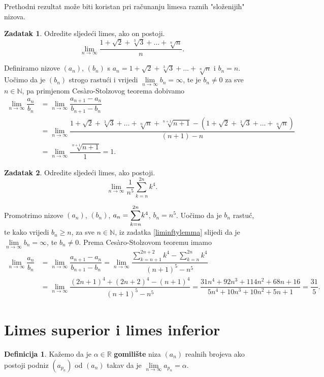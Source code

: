 \documentclass{book}
\renewenvironment{proof}{%
    \vspace{-\parskip}\begin{oldproof}%
    }{%
    \end{oldproof}%
}
\theoremstyle{definition}
\theoremstyle{definition}
\newtheorem{definition}{Definicija}
\newtheorem{exercise}{Zadatak}
\theoremstyle{remark}
\begin{document}
Prethodni rezultat može biti koristan pri računanju limesa raznih "složenijih" nizova.
\begin{exercise}
Odredite sljedeći limes, ako on postoji. 
$$\lim\limits_{n\to \infty}{\dfrac{1+\sqrt{2}+\sqrt[3]{3}+\dots+\sqrt[n]{n}}{n}}.$$
\end{exercise}
\begin{proof}[Rješenje]
Definiramo nizove $(a_n)$, $(b_n)$ s $a_n=1+\sqrt{2}+\sqrt[3]{3}+\dots+\sqrt[n]{n}$ i $b_n=n$. Uočimo da je $(b_n)$ strogo rastući i vrijedi $\lim\limits_{n\to \infty}{b_n}=\infty$, te je $b_n\neq 0$ za sve $n\in \mathbb{N}$, pa primjenom Cesàro-Stolzovog teorema dobivamo
\begin{align*}
\lim\limits_{n\to \infty}{\dfrac{a_n}{b_n}}&=\lim\limits_{n\to \infty}{\dfrac{a_{n+1}-a_n}{b_{n+1}-b_n}}\\
&=\lim\limits_{n\to \infty}{\dfrac{1+\sqrt{2}+\sqrt[3]{3}+\dots+\sqrt[n]{n}+\sqrt[n+1]{n+1}-(1+\sqrt{2}+\sqrt[3]{3}+\dots+\sqrt[n]{n})}{(n+1)-n}}\\
&=\lim\limits_{n\to \infty}{\dfrac{\sqrt[n+1]{n+1}}{1}}=1.
\end{align*}
\end{proof}
\begin{exercise}
Odredite sljedeći limes, ako postoji.
$$\lim\limits_{n\to \infty}{\dfrac{1}{n^5}\sum_{k=n}^{2n}{k^4}}.$$
\end{exercise}
\begin{proof}[Rješenje]
Promotrimo nizove $(a_n)$, $(b_n)$, $a_n=\dsum_{k=n}^{2n}{k^4}$, $b_n=n^5$. Uočimo da je $b_n$ rastuć, te kako vrijedi $b_n\geq n$, za sve $n\in \mathbb{N}$, iz zadatka \ref{liminftylemma} slijedi da je $\lim\limits_{n\to \infty}{b_n}=\infty$, te $b_n\neq 0$. Prema Cesàro-Stolzovom teoremu imamo
\begin{align*}
\lim\limits_{n\to \infty}{\dfrac{a_n}{b_n}}&=\lim\limits_{n\to\infty}{\dfrac{a_{n+1}-a_n}{b_{n+1}-b_n}}
=\lim\limits_{n\to \infty}{\dfrac{\sum_{k=n+1}^{2n+2}{k^4}-\sum_{k=n}^{2n}{k^4}}{(n+1)^5-n^5}}\\
&=\lim\limits_{n\to \infty}{\dfrac{(2n+1)^4+(2n+2)^4-(n+1)^4}{(n+1)^5-n^5}}=\dfrac{31n^4+92n^3+114n^2+68n+16}{5n^4+10n^3+10n^2+5n+1}=\dfrac{31}{5}.
\end{align*}
\end{proof}
\section{Limes superior i limes inferior}
\begin{definition}
Kažemo da je $\alpha\in \mathbb{R}$ \textbf{gomilište} niza $(a_n)$ realnih brojeva ako postoji podniz $(a_{p_n})$ od $(a_n)$ takav da je $\lim\limits_{n\to \infty}{a_{p_n}}=\alpha$.
\end{definition}
\end{document}
